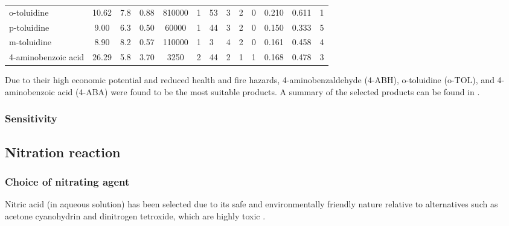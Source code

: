 \begin{table}[h]
\begin{tabularx}{\linewidth}{l|S[table-format=4.2]S[table-format=1.1]XS[table-format=7.0,round-mode=figures,round-precision=2]|XX|lll|S[table-format=1.3]S[table-format=1.3]c}
o-toluidine         & 10.62           & 7.8 & 0.88                           & 810000              & 1                   & 53                       & 3      & 2            & 0           & 0.210                 & 0.611                    & 1 \\ 
p-toluidine         & 9.00             & 6.3 & 0.50                           & 60000               & 1                   & 44                       & 3      & 2            & 0           & 0.150                 & 0.333                    & 5                         \\ 
m-toluidine         & 8.90           & 8.2 & 0.57                           & 110000              & 1                   & 3                       & 4      & 2            & 0           & 0.161                 & 0.458                    & 4                         \\ 
4-aminobenzoic acid & 26.29         & 5.8 & 3.70                           & 3250               & 2                 & 44                       & 2      & 1            & 1           & 0.168                 & 0.478                    & 3 \\ \bottomrule
\end{tabularx}
\end{table}

Due to their high economic potential and reduced health and fire hazards, 4-aminobenzaldehyde (4-ABH), o-toluidine (o-TOL), and 4-aminobenzoic acid (4-ABA) were found to be the most suitable products. A  summary of the selected products can be found in .


\subsubsection{Sensitivity}

\subsection{Nitration reaction}

\subsubsection{Choice of nitrating agent}
Nitric acid (in aqueous solution) has been selected due to its safe and environmentally friendly nature relative to alternatives such as acetone cyanohydrin and dinitrogen tetroxide, which are highly toxic \cite{miller_kinetics_1964,dagade_nitration_2002, sreedhar_scientific_2013}. 

